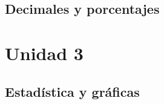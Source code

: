 \documentclass[12pt,addpoints]{repaso}
\begin{document}
\begin{questions}
	\subsection*{Decimales y porcentajes}

\section*{Unidad 3} 
	\subsection*{Estadística y gráficas}                                            

\end{questions}
\end{document}
